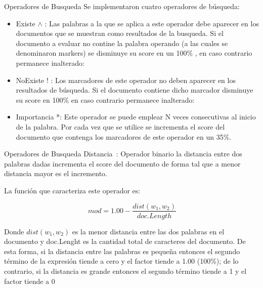 \documentclass{beamer}
\begin{document}
\begin{frame}{Operadores de Busqueda}
Se implementaron cuatro operadores de búsqueda:
	\begin{itemize}
	\item  Existe $\wedge$ : Las palabras a la que se aplica a este operador debe aparecer en los
	documentos que se muestran como resultados de la busqueda. Si el documento a
	evaluar no contine la palabra operando (a las cuales se denominaron markers) se
	disminuye su score en un 100$\%$ , en caso contrario permanece inalterado:
	
	\item NoExiste ! : Los marcadores de este operador no deben aparecer en los resultados de
	búsqueda. Si el documento contiene dicho marcador disminuye su score en 100\% en
	caso contrario permanece inalterado:
	
	\item Importancia *: Este operador se puede emplear N veces consecutivas al inicio de la
	palabra. Por cada vez que se utilice se incrementa el score del documento que contenga
	los marcadores de este operador en un 35\%.
	\end{itemize} 
\end{frame}
			
\begin{frame}{Operadores de Busqueda}
	Distancia~: Operador binario la	distancia entre dos palabras dadas incrementa el score del documento de forma tal que a menor
	distancia mayor es el incremento. 
	
	\begin{center}
		La función que caracteriza este operador es:
		
		\begin{equation}
			~mod = 1.00 - \frac{dist(w_1,w_2)}{doc.Length}
		\end{equation}
	\end{center}
	Donde $dist(w_1, w_2)$ es la menor distancia entre las dos palabras en el
	documento y doc.Lenght es la cantidad total de caracteres del documento.
	De esta forma, si la distancia entre las palabras es pequeña entonces el segundo término
	de la expresión tiende a cero y el factor tiende a 1.00 (100\%); de lo contrario, si la
	distancia es grande entonces el segundo término tiende a 1 y el factor tiende a 0%
\end{frame}
\end{document}
